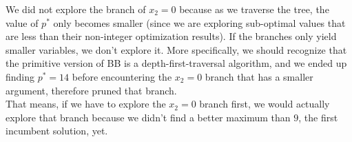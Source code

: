 We did not explore the branch of $x_2 = 0$ because as we traverse the tree, the value of $p^*$ only becomes smaller (since we are exploring sub-optimal values that are less than their non-integer optimization results).
If the branches only yield smaller variables, we don't explore it.
More specifically, we should recognize that the primitive version of BB is a depth-first-traversal algorithm, and we ended up finding $p^* = 14$ before encountering the $x_2 = 0$ branch that has a smaller argument, therefore pruned that branch. \\
That means, if we have to explore the $x_2 = 0$ branch first, we would actually explore that branch because we didn't find a better maximum than $9$, the first incumbent solution, yet.

